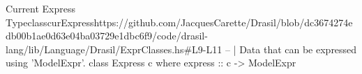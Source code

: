 \begin{haskell}{Current Express Typeclass}{curExpress}{https://github.com/JacquesCarette/Drasil/blob/dc3674274edb00b1ae0d63e04ba03729e1dbc6f9/code/drasil-lang/lib/Language/Drasil/ExprClasses.hs\#L9-L11}
-- | Data that can be expressed using 'ModelExpr'.
class Express c where
  express :: c -> ModelExpr
\end{haskell}
